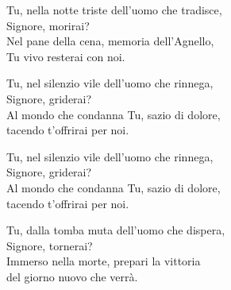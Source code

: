 
\strofa Tu, nella notte triste dell'uomo che tradisce,\\
Signore, morirai?\\
Nel pane della cena, memoria dell'Agnello,\\
Tu vivo resterai con noi.

\spazio

\strofa Tu, nel silenzio vile dell'uomo che rinnega,\\
Signore, griderai?\\
Al mondo che condanna Tu, sazio di dolore,\\
tacendo t'offrirai per noi.

\spazio

\strofa Tu, nel silenzio vile dell'uomo che rinnega,\\
Signore, griderai?\\
Al mondo che condanna Tu, sazio di dolore,\\
tacendo t'offrirai per noi.

\spazio

\strofa Tu, dalla tomba muta dell'uomo che dispera,\\
Signore, tornerai?\\
Immerso nella morte, prepari la vittoria\\ 
del giorno nuovo che verrà.
